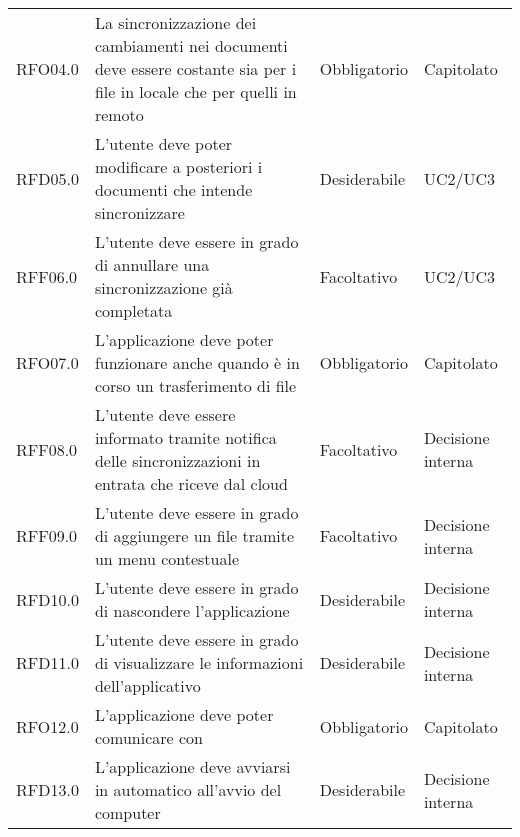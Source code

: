 {\begin{longtable}{C{.20\freewidth} C{.40\freewidth} C{.20\freewidth} C{.20\freewidth}}
        RFO04.0  & La sincronizzazione dei cambiamenti nei documenti deve essere costante sia per i file in locale che per quelli in remoto & Obbligatorio & Capitolato \\
        RFD05.0  & L'utente deve poter modificare a posteriori i documenti che intende sincronizzare & Desiderabile & UC2/UC3 \\
        RFF06.0  & L'utente deve essere in grado di annullare una sincronizzazione già completata & Facoltativo & UC2/UC3 \\
        RFO07.0  & L'applicazione deve poter funzionare anche quando è in corso un trasferimento di file & Obbligatorio & Capitolato \\
        RFF08.0  & L'utente deve essere informato tramite notifica delle sincronizzazioni in entrata che riceve dal cloud & Facoltativo & Decisione interna \\
        RFF09.0  & L'utente deve essere in grado di aggiungere un file tramite un menu contestuale & Facoltativo & Decisione interna \\
        RFD10.0  & L'utente deve essere in grado di nascondere l'applicazione & Desiderabile & Decisione interna \\
        RFD11.0  & L'utente deve essere in grado di visualizzare le informazioni dell'applicativo & Desiderabile & Decisione interna \\
        RFO12.0  & L'applicazione deve poter comunicare con  & Obbligatorio & Capitolato \\
        RFD13.0  & L'applicazione deve avviarsi in automatico all'avvio del computer & Desiderabile & Decisione interna \\


\end{longtable}}
